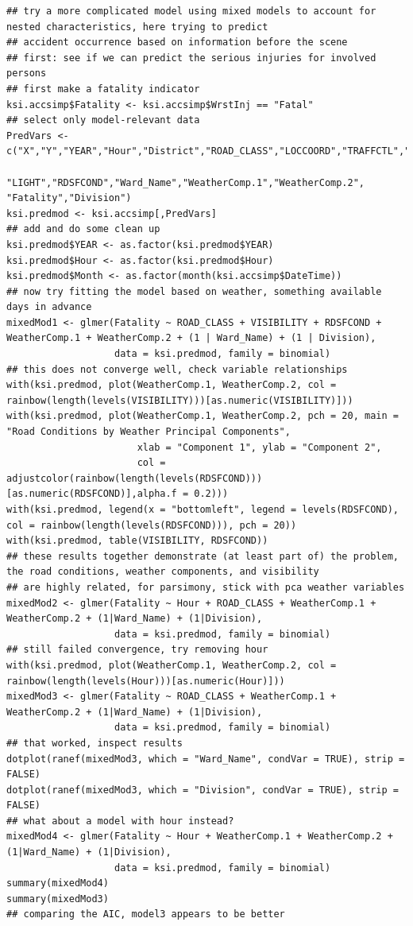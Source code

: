 \documentclass{article}
\begin{document}
\begin{lstlisting}
## try a more complicated model using mixed models to account for nested characteristics, here trying to predict
## accident occurrence based on information before the scene
## first: see if we can predict the serious injuries for involved persons
## first make a fatality indicator
ksi.accsimp$Fatality <- ksi.accsimp$WrstInj == "Fatal"
## select only model-relevant data
PredVars <- c("X","Y","YEAR","Hour","District","ROAD_CLASS","LOCCOORD","TRAFFCTL","VISIBILITY",
              "LIGHT","RDSFCOND","Ward_Name","WeatherComp.1","WeatherComp.2", "Fatality","Division")
ksi.predmod <- ksi.accsimp[,PredVars]
## add and do some clean up
ksi.predmod$YEAR <- as.factor(ksi.predmod$YEAR)
ksi.predmod$Hour <- as.factor(ksi.predmod$Hour)
ksi.predmod$Month <- as.factor(month(ksi.accsimp$DateTime))
## now try fitting the model based on weather, something available days in advance
mixedMod1 <- glmer(Fatality ~ ROAD_CLASS + VISIBILITY + RDSFCOND + WeatherComp.1 + WeatherComp.2 + (1 | Ward_Name) + (1 | Division),
                   data = ksi.predmod, family = binomial)
## this does not converge well, check variable relationships
with(ksi.predmod, plot(WeatherComp.1, WeatherComp.2, col = rainbow(length(levels(VISIBILITY)))[as.numeric(VISIBILITY)]))
with(ksi.predmod, plot(WeatherComp.1, WeatherComp.2, pch = 20, main = "Road Conditions by Weather Principal Components",
                       xlab = "Component 1", ylab = "Component 2",
                       col = adjustcolor(rainbow(length(levels(RDSFCOND)))[as.numeric(RDSFCOND)],alpha.f = 0.2)))
with(ksi.predmod, legend(x = "bottomleft", legend = levels(RDSFCOND), col = rainbow(length(levels(RDSFCOND))), pch = 20))
with(ksi.predmod, table(VISIBILITY, RDSFCOND))
## these results together demonstrate (at least part of) the problem, the road conditions, weather components, and visibility
## are highly related, for parsimony, stick with pca weather variables
mixedMod2 <- glmer(Fatality ~ Hour + ROAD_CLASS + WeatherComp.1 + WeatherComp.2 + (1|Ward_Name) + (1|Division),
                   data = ksi.predmod, family = binomial)
## still failed convergence, try removing hour
with(ksi.predmod, plot(WeatherComp.1, WeatherComp.2, col = rainbow(length(levels(Hour)))[as.numeric(Hour)]))
mixedMod3 <- glmer(Fatality ~ ROAD_CLASS + WeatherComp.1 + WeatherComp.2 + (1|Ward_Name) + (1|Division),
                   data = ksi.predmod, family = binomial)
## that worked, inspect results
dotplot(ranef(mixedMod3, which = "Ward_Name", condVar = TRUE), strip = FALSE)
dotplot(ranef(mixedMod3, which = "Division", condVar = TRUE), strip = FALSE)
## what about a model with hour instead?
mixedMod4 <- glmer(Fatality ~ Hour + WeatherComp.1 + WeatherComp.2 + (1|Ward_Name) + (1|Division),
                   data = ksi.predmod, family = binomial)
summary(mixedMod4)
summary(mixedMod3)
## comparing the AIC, model3 appears to be better
\end{lstlisting} \label{code}
\end{document}
